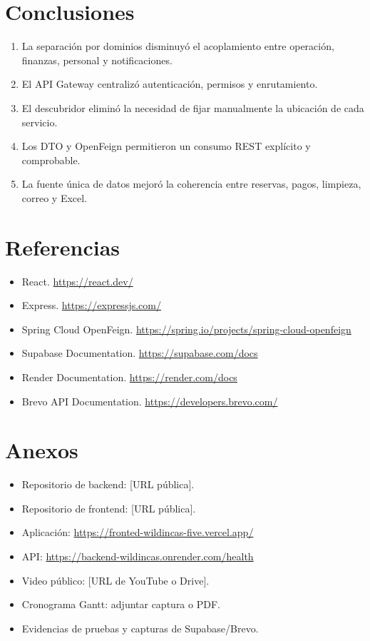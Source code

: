 \documentclass[12pt,a4paper]{article}
\begin{document}
\section{Conclusiones}

\begin{enumerate}
\item La separación por dominios disminuyó el acoplamiento entre operación, finanzas, personal y notificaciones.
\item El API Gateway centralizó autenticación, permisos y enrutamiento.
\item El descubridor eliminó la necesidad de fijar manualmente la ubicación de cada servicio.
\item Los DTO y OpenFeign permitieron un consumo REST explícito y comprobable.
\item La fuente única de datos mejoró la coherencia entre reservas, pagos, limpieza, correo y Excel.
\end{enumerate}

\section{Referencias}

\begin{itemize}
\item React. \url{https://react.dev/}
\item Express. \url{https://expressjs.com/}
\item Spring Cloud OpenFeign. \url{https://spring.io/projects/spring-cloud-openfeign}
\item Supabase Documentation. \url{https://supabase.com/docs}
\item Render Documentation. \url{https://render.com/docs}
\item Brevo API Documentation. \url{https://developers.brevo.com/}
\end{itemize}

\section{Anexos}

\begin{itemize}
\item Repositorio de backend: [URL pública].
\item Repositorio de frontend: [URL pública].
\item Aplicación: \url{https://fronted-wildincas-five.vercel.app/}
\item API: \url{https://backend-wildincas.onrender.com/health}
\item Video público: [URL de YouTube o Drive].
\item Cronograma Gantt: adjuntar captura o PDF.
\item Evidencias de pruebas y capturas de Supabase/Brevo.
\end{itemize}
\end{document}
